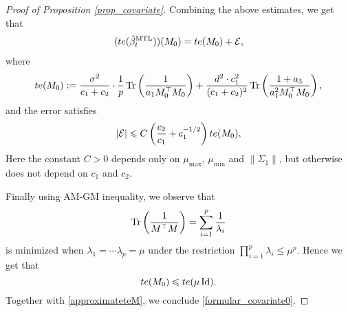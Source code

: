 \begin{proof}[Proof of Proposition \ref{prop_covariate}]
Combining the above estimates, we get that 
\begin{align}\label{approximateteM}
(te(\hat{\beta}_t^{\text{MTL}}))(M_0) =  te(M_0) + \mathcal E,
\end{align}
where
$$te(M_0):=\frac{\sigma^2}{c_1+c_2}\cdot \frac1p\operatorname{Tr}\left( \frac{1}{a_1M_0^\top M_0}\right)  +\frac{d^2\cdot c_1^2}{(c_1 + c_2)^2} \operatorname{Tr}\left(\frac{1 + a_3}{a_1^2 M_0^{\top}{M_0}} \right),$$
and the error satisfies
$$|\mathcal E|\leqslant C\left( \frac{c_2}{c_1} +c_1^{-1/2}\right)te(M_0),$$
Here the constant $C>0$ depends only on $\mu_{\max}$, $\mu_{\min}$ and $\|\Sigma_1\|$, but otherwise does not depend on $c_1$ and $c_2$. 

%


Finally using AM-GM inequality, we observe that 
$$\operatorname{Tr}\left( \frac{1}{M^\top M}\right) = \sum_{i=1}^p\frac{1}{\lambda_i}$$
is minimized when $\lambda_1 = \cdots\lambda_p=\mu$ under the restriction $\prod_{i=1}^p\lambda_i\le \mu^p$. Hence we get that 
$$ te (M_0)\leqslant te(\mu \operatorname{Id}).$$
Together with \eqref{approximateteM}, we conclude \eqref{formular_covariate0}.
\end{proof}

